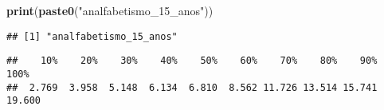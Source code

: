 \documentclass[
]{article}
\newenvironment{Shaded}{\begin{snugshade}}{\end{snugshade}}
\newcommand{\AttributeTok}[1]{\textcolor[rgb]{0.13,0.29,0.53}{#1}}
\newcommand{\DecValTok}[1]{\textcolor[rgb]{0.00,0.00,0.81}{#1}}
\newcommand{\FunctionTok}[1]{\textcolor[rgb]{0.13,0.29,0.53}{\textbf{#1}}}
\newcommand{\NormalTok}[1]{#1}
\newcommand{\SpecialCharTok}[1]{\textcolor[rgb]{0.81,0.36,0.00}{\textbf{#1}}}
\newcommand{\StringTok}[1]{\textcolor[rgb]{0.31,0.60,0.02}{#1}}
\begin{document}
\begin{Shaded}
\begin{Highlighting}[]
\FunctionTok{print}\NormalTok{(}\FunctionTok{paste0}\NormalTok{(}\StringTok{"analfabetismo\_15\_anos"}\NormalTok{))}
\end{Highlighting}
\end{Shaded}

\begin{verbatim}
## [1] "analfabetismo_15_anos"
\end{verbatim}

\begin{Shaded}
\end{Shaded}

\begin{verbatim}
##    10%    20%    30%    40%    50%    60%    70%    80%    90%   100% 
##  2.769  3.958  5.148  6.134  6.810  8.562 11.726 13.514 15.741 19.600
\end{verbatim}

\begin{Shaded}
\end{Shaded}
\end{document}
